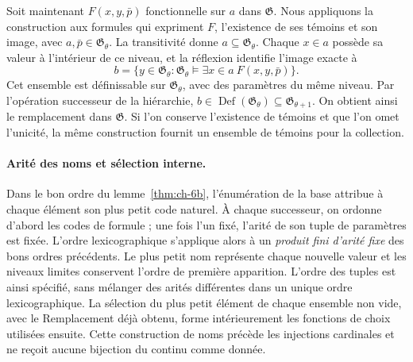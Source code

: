 Soit maintenant \(F(x,y,\bar p)\) fonctionnelle sur \(a\) dans \(\mathfrak G\). Nous appliquons la construction aux formules qui expriment \(F\), l'existence de ses témoins et son image, avec \(a,\bar p\in\mathfrak G_\theta\). La transitivité donne \(a\subseteq\mathfrak G_\theta\). Chaque \(x\in a\) possède sa valeur à l'intérieur de ce niveau, et la réflexion identifie l'image exacte à
\[
 b=\{y\in\mathfrak G_\theta:
       \mathfrak G_\theta\models
       \exists x\in a\ F(x,y,\bar p)\}.
\]
Cet ensemble est définissable sur \(\mathfrak G_\theta\), avec des paramètres du même niveau. Par l'opération successeur de la hiérarchie, \(b\in\operatorname{Def}(\mathfrak G_\theta)
\subseteq\mathfrak G_{\theta+1}\). On obtient ainsi le remplacement dans \(\mathfrak G\). Si l'on conserve l'existence de témoins et que l'on omet l'unicité, la même construction fournit un ensemble de témoins pour la collection.

\paragraph{Arité des noms et sélection interne.}
Dans le bon ordre du lemme~\ref{thm:ch-6b}, l’énumération de la base
attribue à chaque élément son plus petit code naturel. À chaque successeur, on ordonne
d’abord les codes de formule ; une fois l’un fixé, l’arité de son
tuple de paramètres est fixée. L’ordre lexicographique s’applique alors à un
\emph{produit fini d’arité fixe} des bons ordres précédents.
Le plus petit nom représente chaque nouvelle valeur et les niveaux limites conservent
l’ordre de première apparition. L’ordre des tuples est ainsi spécifié,
sans mélanger des arités différentes dans un unique ordre
lexicographique. La sélection du plus petit élément de chaque ensemble non vide,
avec le Remplacement déjà obtenu, forme intérieurement les fonctions de
choix utilisées ensuite. Cette construction de noms précède les
injections cardinales et ne reçoit aucune bijection du continu comme
donnée.
